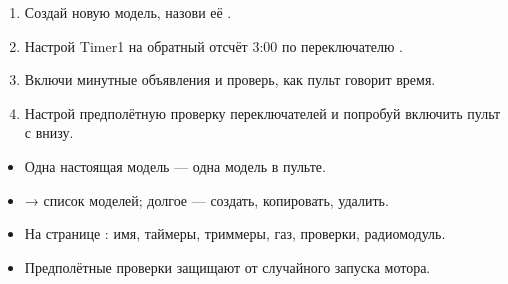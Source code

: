 \begin{tryit}
\begin{enumerate}
  \item Создай новую модель, назови её .
  \item Настрой Timer1 на обратный отсчёт 3:00 по переключателю .
  \item Включи минутные объявления и проверь, как пульт говорит время.
  \item Настрой предполётную проверку переключателей и попробуй включить пульт с  внизу.
\end{enumerate}
\end{tryit}

\begin{summary}
\begin{itemize}
  \item Одна настоящая модель --- одна модель в пульте.
  \item {} → список моделей; долгое  --- создать, копировать, удалить.
  \item На странице : имя, таймеры, триммеры, газ, проверки, радиомодуль.
  \item Предполётные проверки защищают от случайного запуска мотора.
\end{itemize}
\end{summary}
